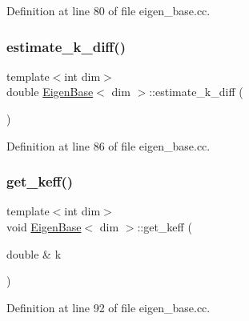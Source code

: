 Definition at line 80 of file eigen\+\_\+base.\+cc.

\mbox{\label{class_eigen_base_ac9b7836c98e95a8be4d57b3ccf11f185}} 
\subsubsection{\texorpdfstring{estimate\+\_\+k\+\_\+diff()}{estimate\_k\_diff()}}
{\footnotesize\ttfamily template$<$int dim$>$ \\
double \hyperlink{class_eigen_base}{Eigen\+Base}$<$ dim $>$\+::estimate\+\_\+k\+\_\+diff (\begin{DoxyParamCaption}{ }\end{DoxyParamCaption})\hspace{0.3cm}{\ttfamily [protected]}}



Definition at line 86 of file eigen\+\_\+base.\+cc.

\mbox{\label{class_eigen_base_aeb0646a8338d5929cb33d5d7aee49e08}} 
\subsubsection{\texorpdfstring{get\+\_\+keff()}{get\_keff()}}
{\footnotesize\ttfamily template$<$int dim$>$ \\
void \hyperlink{class_eigen_base}{Eigen\+Base}$<$ dim $>$\+::get\+\_\+keff (\begin{DoxyParamCaption}\item[{double \&}]{k }\end{DoxyParamCaption})}



Definition at line 92 of file eigen\+\_\+base.\+cc.

\mbox{\label{class_eigen_base_a833156f74622e81a0e4e191e1b972186}} 
